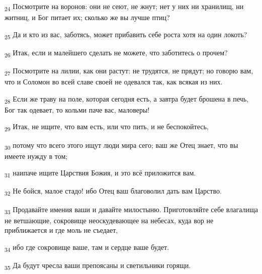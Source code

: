 \begin{tcolorbox}
\textsubscript{24} Посмотрите на воронов: они не сеют, не жнут; нет у них ни хранилищ, ни житниц, и Бог питает их; сколько же вы лучше птиц?
\end{tcolorbox}
\begin{tcolorbox}
\textsubscript{25} Да и кто из вас, заботясь, может прибавить себе роста хотя на один локоть?
\end{tcolorbox}
\begin{tcolorbox}
\textsubscript{26} Итак, если и малейшего сделать не можете, что заботитесь о прочем?
\end{tcolorbox}
\begin{tcolorbox}
\textsubscript{27} Посмотрите на лилии, как они растут: не трудятся, не прядут; но говорю вам, что и Соломон во всей славе своей не одевался так, как всякая из них.
\end{tcolorbox}
\begin{tcolorbox}
\textsubscript{28} Если же траву на поле, которая сегодня есть, а завтра будет брошена в печь, Бог так одевает, то кольми паче вас, маловеры!
\end{tcolorbox}
\begin{tcolorbox}
\textsubscript{29} Итак, не ищите, что вам есть, или что пить, и не беспокойтесь,
\end{tcolorbox}
\begin{tcolorbox}
\textsubscript{30} потому что всего этого ищут люди мира сего; ваш же Отец знает, что вы имеете нужду в том;
\end{tcolorbox}
\begin{tcolorbox}
\textsubscript{31} наипаче ищите Царствия Божия, и это всё приложится вам.
\end{tcolorbox}
\begin{tcolorbox}
\textsubscript{32} Не бойся, малое стадо! ибо Отец ваш благоволил дать вам Царство.
\end{tcolorbox}
\begin{tcolorbox}
\textsubscript{33} Продавайте имения ваши и давайте милостыню. Приготовляйте себе влагалища не ветшающие, сокровище неоскудевающее на небесах, куда вор не приближается и где моль не съедает,
\end{tcolorbox}
\begin{tcolorbox}
\textsubscript{34} ибо где сокровище ваше, там и сердце ваше будет.
\end{tcolorbox}
\begin{tcolorbox}
\textsubscript{35} Да будут чресла ваши препоясаны и светильники горящи.
\end{tcolorbox}
